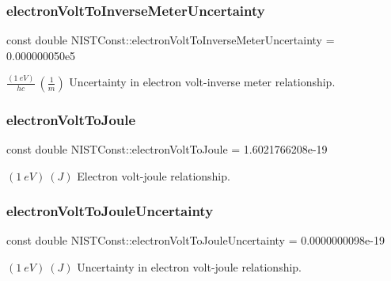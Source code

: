 \subsubsection{\texorpdfstring{electron\+Volt\+To\+Inverse\+Meter\+Uncertainty}{electronVoltToInverseMeterUncertainty}}
{\footnotesize\ttfamily const double N\+I\+S\+T\+Const\+::electron\+Volt\+To\+Inverse\+Meter\+Uncertainty = 0.\+000000050e5}

$\frac{(1\ eV)}{hc} \ (\frac{1}{m})$ Uncertainty in electron volt-\/inverse meter relationship. \mbox{\label{group___n_i_s_t_const-_electron_volt_ga51a94280936d8d7e92cbac054e1df485}} 
\subsubsection{\texorpdfstring{electron\+Volt\+To\+Joule}{electronVoltToJoule}}
{\footnotesize\ttfamily const double N\+I\+S\+T\+Const\+::electron\+Volt\+To\+Joule = 1.\+6021766208e-\/19}

$(1\ eV) \ (J)$ Electron volt-\/joule relationship. \mbox{\label{group___n_i_s_t_const-_electron_volt_ga32594652a8bac45e8676551612471385}} 
\subsubsection{\texorpdfstring{electron\+Volt\+To\+Joule\+Uncertainty}{electronVoltToJouleUncertainty}}
{\footnotesize\ttfamily const double N\+I\+S\+T\+Const\+::electron\+Volt\+To\+Joule\+Uncertainty = 0.\+0000000098e-\/19}

$(1\ eV) \ (J)$ Uncertainty in electron volt-\/joule relationship. \mbox{\label{group___n_i_s_t_const-_electron_volt_ga9cd0e681c5b9edabd2f1840c88d90176}} 
